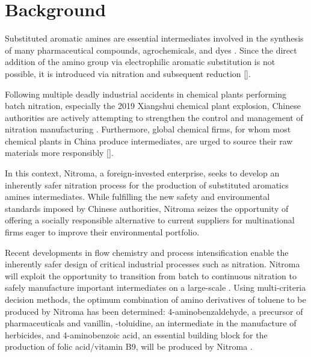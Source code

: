 \section{Background}

Substituted aromatic amines are essential intermediates involved in the synthesis of many pharmaceutical compounds, agrochemicals, and dyes \cite{vogt_amines_2000}. Since the direct addition of the amino group via electrophilic aromatic substitution is not possible, it is introduced via nitration and subsequent reduction []. 

Following multiple deadly industrial accidents in chemical plants performing batch nitration, especially the 2019 Xiangshui chemical plant explosion, Chinese authorities are actively attempting to strengthen the control and management of nitration manufacturing \cite{el_diario_china_2019}. Furthermore, global chemical firms, for whom most chemical plants in China produce intermediates, are urged to source their raw materials more responsibly [].


In this context, Nitroma, a foreign-invested enterprise, seeks to develop an inherently safer nitration process for the production of substituted aromatics amines intermediates. While fulfilling the new safety and environmental standards imposed by Chinese authorities, Nitroma seizes the opportunity of offering a socially responsible alternative to current suppliers for multinational firms eager to improve their environmental portfolio. 

Recent developments in flow chemistry and process intensification enable the inherently safer design of critical industrial processes such as nitration. Nitroma will exploit the opportunity to transition from batch to continuous nitration to safely manufacture important intermediates on a large-scale \cite{di_miceli_raimondi_safety_2015}. Using multi-criteria decision methods, the optimum combination of amino derivatives of toluene to be produced by Nitroma has been determined: 4-aminobenzaldehyde, a precursor of pharmaceuticals and vanillin, \ortho-toluidine, an intermediate in the manufacture of herbicides, and 4-aminobenzoic acid, an essential building block for the production of folic acid/vitamin B9, will be produced by Nitroma \cite{bowers_toluidines_2000,bruhne_benzaldehyde_2011,maki_benzoic_2000}.

